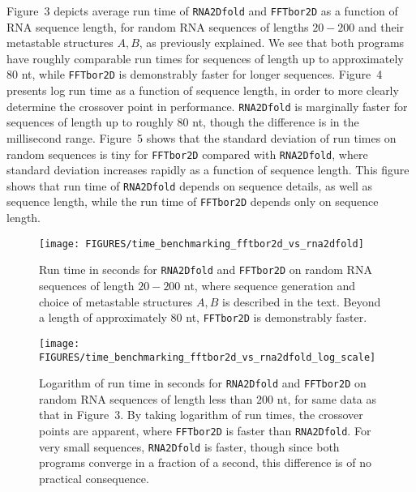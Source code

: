 Figure~3 depicts average run time of {\tt RNA2Dfold}
and {\tt FFTbor2D} as a function of RNA sequence length, for random RNA
sequences of lengths $20-200$ and their metastable structures $A,B$, as
previously explained.  We see that both programs have
roughly comparable run times for sequences of length up to approximately
80 nt, while {\tt FFTbor2D} is demonstrably faster for longer sequences.
Figure~4 presents log run time as a function of sequence length, in order
to more clearly determine the crossover point in performance.
{\tt RNA2Dfold} is marginally faster for sequences of
length up to roughly 80 nt, though the difference is in the millisecond
range.
Figure~5
shows that the standard deviation of run times on random sequences is
tiny for {\tt FFTbor2D} compared with {\tt RNA2Dfold}, where standard
deviation increases rapidly as a function of sequence length. This figure
shows that run time of {\tt RNA2Dfold} depends on sequence details, as
well as sequence length, while the run time of {\tt FFTbor2D} depends only
on sequence length.

\begin{figure}[!t]
\begin{center}
\texttt{[image: FIGURES/time\_benchmarking\_fftbor2d\_vs\_rna2dfold]}
\caption{\small
Run time in seconds for {\tt RNA2Dfold} and {\tt FFTbor2D} on random
RNA sequences of length $20-200$ nt, where sequence generation and
choice of metastable structures $A,B$ is described in the text.
Beyond a length of approximately $80$ nt, {\tt FFTbor2D} is demonstrably
faster.
}
\label{fig:benchmarking1}
\end{center}
\end{figure}


\begin{figure}[!b]
\begin{center}
\texttt{[image: FIGURES/time\_benchmarking\_fftbor2d\_vs\_rna2dfold\_log\_scale]}
\caption{\small
Logarithm of run time in seconds for {\tt RNA2Dfold} and {\tt FFTbor2D}
on random RNA sequences of length less than $200$ nt, for same data as that
in Figure~3. By taking logarithm of run times, the
crossover points are apparent,
where {\tt FFTbor2D} is faster than {\tt RNA2Dfold}. For very small
sequences, {\tt RNA2Dfold} is faster, though since both programs converge
in a fraction of a second, this difference is of no practical consequence.
}
\label{fig:benchmarking2}
\end{center}
\end{figure}

